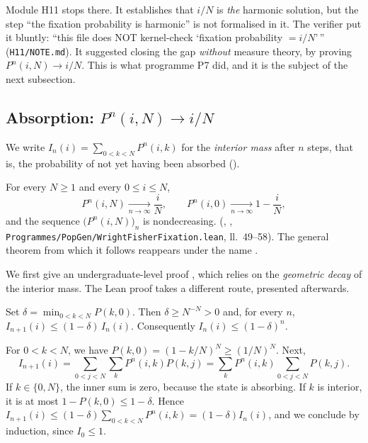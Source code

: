 \begin{warnbox}
Module H11 \cite{ch4:H1112} stops there. It establishes that $i/N$ is \emph{the} harmonic solution, but the step ``the fixation
probability is harmonic'' is not formalised in it. The verifier put it bluntly: ``this file does NOT
kernel-check `fixation probability $= i/N$'\,'' (\texttt{H11/NOTE.md}). It suggested closing the gap
\emph{without} measure theory, by proving $P^n(i,N)\to i/N$. This is what programme P7 did, and it is
the subject of the next subsection.
\end{warnbox}

\subsection{Absorption: \texorpdfstring{$P^n(i,N)\to i/N$}{P\^{}n(i,N) -> i/N}}
We write $I_n(i)=\sum_{0<k<N}P^n(i,k)$ for the \emph{interior mass} after $n$ steps, that is, the probability of not
yet having been absorbed ().

\begin{theorem}\label{ch4:thm:wflim}
For every $N\ge1$ and every $0\le i\le N$,
\[
P^n(i,N)\xrightarrow[n\to\infty]{}\frac iN,\qquad P^n(i,0)\xrightarrow[n\to\infty]{}1-\frac iN,
\]
and the sequence $\bigl(P^n(i,N)\bigr)_n$ is nondecreasing. \tierA{} (,
, \texttt{Programmes/PopGen/}\allowbreak\texttt{WrightFisherFixation.lean}, ll.~49--58). The general theorem  from which it follows reappears under the name .
\end{theorem}

We first give an undergraduate-level proof \tierC, which relies on the \emph{geometric decay}
of the interior mass. The Lean proof takes a different route, presented afterwards.

\begin{lemma}\label{ch4:lem:geom}
Set $\delta=\min_{0<k<N}P(k,0)$. Then $\delta\ge N^{-N}>0$ and, for every $n$, $I_{n+1}(i)\le(1-\delta)\,I_n(i)$.
Consequently $I_n(i)\le(1-\delta)^n$.
\end{lemma}

\begin{humanproof}
For $0<k<N$, we have $P(k,0)=(1-k/N)^N\ge(1/N)^N$. Next,
\[
I_{n+1}(i)=\sum_{0<j<N}\sum_kP^n(i,k)P(k,j)=\sum_kP^n(i,k)\sum_{0<j<N}P(k,j).
\]
If $k\in\{0,N\}$, the inner sum is zero, because the state is absorbing. If $k$ is interior, it is at most
$1-P(k,0)\le1-\delta$. Hence $I_{n+1}(i)\le(1-\delta)\sum_{0<k<N}P^n(i,k)=(1-\delta)I_n(i)$, and we conclude by
induction, since $I_0\le1$.
\end{humanproof}

